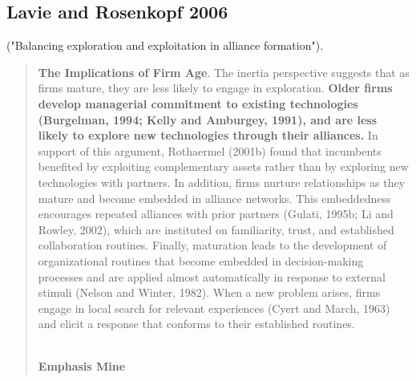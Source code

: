\subsection{Lavie and Rosenkopf 2006}

\cite{lavie2006balancing} ("Balancing exploration and exploitation in alliance formation").\\

\begin{quote}
\textbf{The Implications of Firm Age}.  The inertia perspective suggests that as firms mature, they are less likely to engage in exploration. \textbf{Older firms develop managerial commitment to existing technologies (Burgelman, 1994; Kelly and Amburgey, 1991), and are less likely to explore new technologies through their alliances.} In support of this argument, Rothaermel (2001b) found that incumbents benefited by exploiting complementary assets rather than by exploring new technologies with partners. In addition, firms nurture relationships as they mature and become embedded in alliance networks. This embeddedness encourages repeated alliances with prior partners (Gulati, 1995b; Li and Rowley, 2002), which are instituted on familiarity, trust, and established collaboration routines. Finally, maturation leads to the development of organizational routines that become embedded in decision-making processes and are applied almost automatically in response to external stimuli (Nelson and Winter, 1982). When a new problem arises, firms engage in local search for relevant experiences (Cyert and March, 1963) and elicit a response that conforms to their established routines.
\begin{flushright}
\cite[p.B2]{lavie2006balancing} \\
\textbf{Emphasis Mine}
\end{flushright}
\end{quote}

